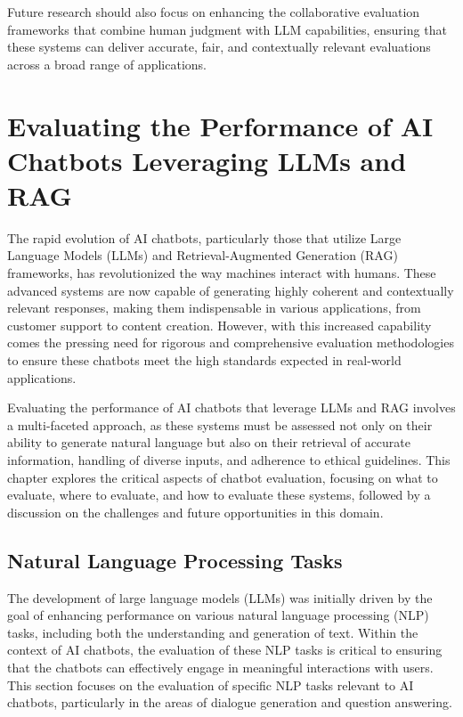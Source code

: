 Future research should also focus on enhancing the collaborative evaluation frameworks that combine human judgment with LLM capabilities, ensuring that these systems can deliver accurate, fair, and contextually relevant evaluations across a broad range of applications.



\section{Evaluating the Performance of AI Chatbots Leveraging LLMs and RAG}

The rapid evolution of AI chatbots, particularly those that utilize Large Language Models (LLMs) and Retrieval-Augmented Generation (RAG) frameworks, has revolutionized the way machines interact with humans. These advanced systems are now capable of generating highly coherent and contextually relevant responses, making them indispensable in various applications, from customer support to content creation. However, with this increased capability comes the pressing need for rigorous and comprehensive evaluation methodologies to ensure these chatbots meet the high standards expected in real-world applications.

Evaluating the performance of AI chatbots that leverage LLMs and RAG involves a multi-faceted approach, as these systems must be assessed not only on their ability to generate natural language but also on their retrieval of accurate information, handling of diverse inputs, and adherence to ethical guidelines. This chapter explores the critical aspects of chatbot evaluation, focusing on what to evaluate, where to evaluate, and how to evaluate these systems, followed by a discussion on the challenges and future opportunities in this domain.

\subsection{Natural Language Processing Tasks}

The development of large language models (LLMs) was initially driven by the goal of enhancing performance on various natural language processing (NLP) tasks, including both the understanding and generation of text. Within the context of AI chatbots, the evaluation of these NLP tasks is critical to ensuring that the chatbots can effectively engage in meaningful interactions with users. This section focuses on the evaluation of specific NLP tasks relevant to AI chatbots, particularly in the areas of dialogue generation and question answering.

